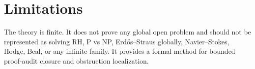 \section{Limitations}
The theory is finite. It does not prove any global open problem and should not be represented as solving RH, P vs NP, Erd\H{o}s--Straus globally, Navier--Stokes, Hodge, Beal, or any infinite family. It provides a formal method for bounded proof-audit closure and obstruction localization.
